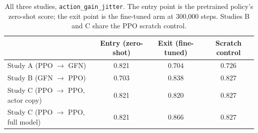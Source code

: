 \begin{table}[htbp]
\centering
\setlength{\tabcolsep}{4pt}
\caption{All three studies, \texttt{action\_gain\_jitter}. The entry point is the
pretrained policy's zero-shot score; the exit point is the fine-tuned arm at
300,000 steps. Studies B and C share the PPO scratch control.}
\small
\begin{tabular}{lccc}
\toprule
 & Entry (zero-shot) & Exit (fine-tuned) & Scratch control \\
\midrule
Study A (PPO $\rightarrow$ GFN)              & 0.821 & $0.704$ & $0.726$ \\
Study B (GFN $\rightarrow$ PPO)              & 0.703 & $0.838$ & $0.827$ \\
Study C (PPO $\rightarrow$ PPO, actor copy)  & 0.821 & $0.820$ & $0.827$ \\
Study C (PPO $\rightarrow$ PPO, full model)  & 0.821 & $0.866$ & $0.827$ \\
\bottomrule
\end{tabular}
\end{table}

